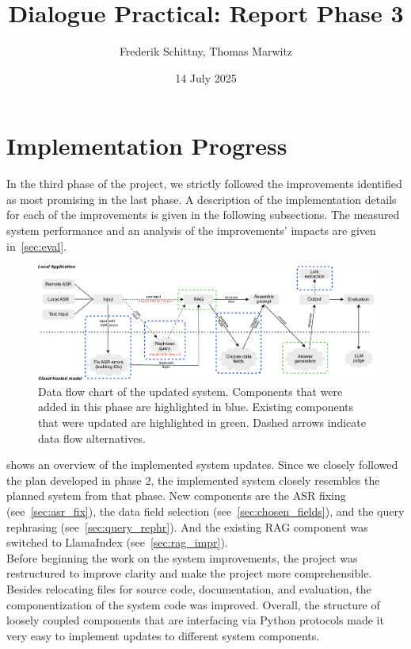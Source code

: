 \documentclass{article}
\title{Dialogue Practical: Report Phase 3}
\author{Frederik Schittny, Thomas Marwitz}
\date{14 July 2025}
\begin{document}
\maketitle

\section{Implementation Progress}
In the third phase of the project, we strictly followed the improvements identified as most promising in the last phase. A description of the implementation details for each of the improvements is given in the following subsections. The measured system performance and an analysis of the improvements' impacts are given in~\cref{sec:eval}.\\

\begin{figure}[htb]
    \centering
    \includegraphics[width=1\linewidth]{data_flow_phase_3.pdf}
    \caption{Data flow chart of the updated system. Components that were added in this phase are highlighted in blue. Existing components that were updated are highlighted in green. Dashed arrows indicate data flow alternatives.}
    \label{fig:data_flow}
\end{figure}

 shows an overview of the implemented system updates. Since we closely followed the plan developed in phase 2, the implemented system closely resembles the planned system from that phase. New components are the ASR fixing (see~\cref{sec:asr_fix}), the data field selection (see~\cref{sec:chosen_fields}), and the query rephrasing (see~\cref{sec:query_rephr}). And the existing RAG component was switched to LlamaIndex (see~\cref{sec:rag_impr}).\\

Before beginning the work on the system improvements, the project was restructured to improve clarity and make the project more comprehensible. Besides relocating files for source code, documentation, and evaluation, the componentization of the system code was improved. Overall, the structure of loosely coupled components that are interfacing via Python protocols made it very easy to implement updates to different system components.
\end{document}
